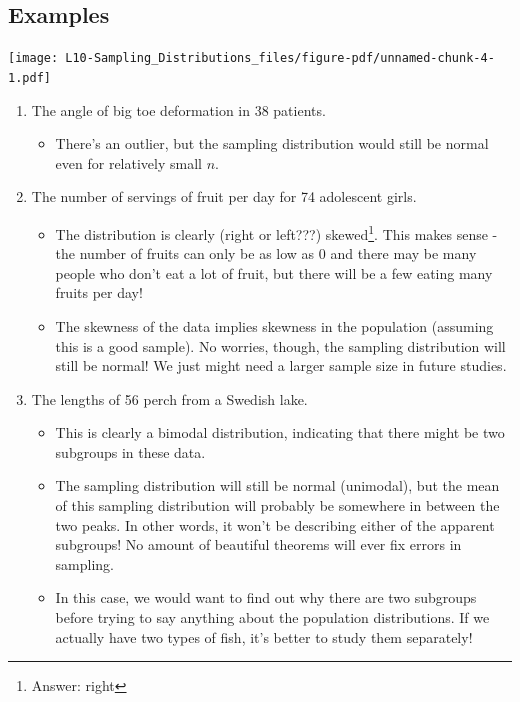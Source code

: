 \documentclass[
  letterpaper,
  DIV=11,
  numbers=noendperiod,
  oneside]{scrreprt}
\providecommand{\tightlist}{%
  \setlength{\itemsep}{0pt}\setlength{\parskip}{0pt}}\usepackage{longtable,booktabs,array}
\begin{document}
\hypertarget{examples-4}{%
\subsection{Examples}\label{examples-4}}

\texttt{[image: L10-Sampling\_Distributions\_files/figure-pdf/unnamed-chunk-4-1.pdf]}

\begin{enumerate}
\def\labelenumi{\alph{enumi}.}
\tightlist
\item
  The angle of big toe deformation in 38 patients.

  \begin{itemize}
  \tightlist
  \item
    There's an outlier, but the sampling distribution would still be
    normal even for relatively small \(n\).
  \end{itemize}
\item
  The number of servings of fruit per day for 74 adolescent girls.

  \begin{itemize}
  \tightlist
  \item
    The distribution is clearly (right or left???) skewed\footnote{Answer:
      right}. This makes sense - the number of fruits can only be as low
    as 0 and there may be many people who don't eat a lot of fruit, but
    there will be a few eating many fruits per day!
  \item
    The skewness of the data implies skewness in the population
    (assuming this is a good sample). No worries, though, the sampling
    distribution will still be normal! We just might need a larger
    sample size in future studies.
  \end{itemize}
\item
  The lengths of 56 perch from a Swedish lake.

  \begin{itemize}
  \tightlist
  \item
    This is clearly a bimodal distribution, indicating that there might
    be two subgroups in these data.
  \item
    The sampling distribution will still be normal (unimodal), but the
    mean of this sampling distribution will probably be somewhere in
    between the two peaks. In other words, it won't be describing either
    of the apparent subgroups! No amount of beautiful theorems will ever
    fix errors in sampling.
  \item
    In this case, we would want to find out why there are two subgroups
    before trying to say anything about the population distributions. If
    we actually have two types of fish, it's better to study them
    separately!
  \end{itemize}
\end{enumerate}
\end{document}
